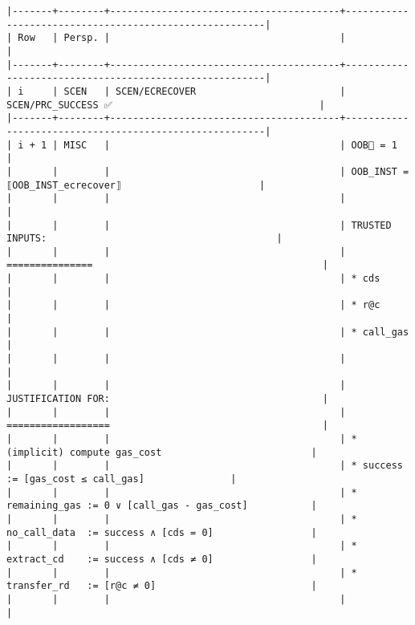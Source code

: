 \documentclass[varwidth=\maxdimen,margin=0.5cm,multi={verbatim}]{standalone}
\begin{document}
\begin{verbatim}
|-------+--------+----------------------------------------+--------------------------------------------------------|
| Row   | Persp. |                                        |                                                        |
|-------+--------+----------------------------------------+--------------------------------------------------------|
| i     | SCEN   | SCEN/ECRECOVER                         | SCEN/PRC_SUCCESS ✅                                    |
|-------+--------+----------------------------------------+--------------------------------------------------------|
| i + 1 | MISC   |                                        | OOB🏴 = 1                                              |
|       |        |                                        | OOB_INST = ⟦OOB_INST_ecrecover⟧                        |
|       |        |                                        |                                                        |
|       |        |                                        | TRUSTED INPUTS:                                        |
|       |        |                                        | ===============                                        |
|       |        |                                        | * cds                                                  |
|       |        |                                        | * r@c                                                  |
|       |        |                                        | * call_gas                                             |
|       |        |                                        |                                                        |
|       |        |                                        | JUSTIFICATION FOR:                                     |
|       |        |                                        | ==================                                     |
|       |        |                                        | * (implicit) compute gas_cost                          |
|       |        |                                        | * success       := [gas_cost ≤ call_gas]               |
|       |        |                                        | * remaining_gas := 0 ∨ [call_gas - gas_cost]           |
|       |        |                                        | * no_call_data  := success ∧ [cds = 0]                 |
|       |        |                                        | * extract_cd    := success ∧ [cds ≠ 0]                 |
|       |        |                                        | * transfer_rd   := [r@c ≠ 0]                           |
|       |        |                                        |                                                        |

\end{verbatim}
\end{document}
